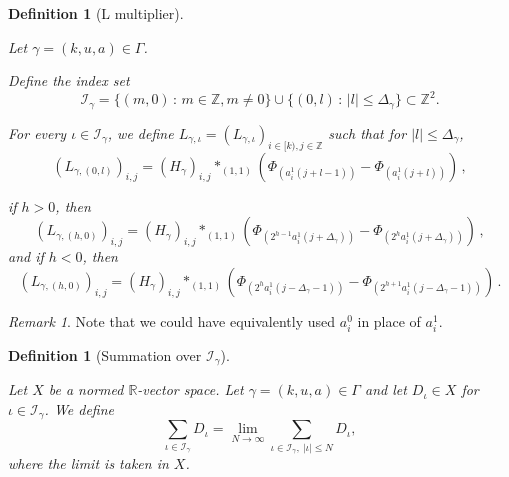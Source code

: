 \documentclass[12pt,reqno]{amsart}
\theoremstyle{plain}
\newtheorem{definition}[theorem]{Definition}
\numberwithin{equation}{section}
\theoremstyle{remark}
\newtheorem{rem}{Remark}[section]
\newcommand{\uses}[1]{}
\newcommand{\usesdefs}[1]{}
\newcommand{\lean}[1]{}
\newcommand{\Z}{{\mathbb Z}}
\newcommand{\R}{{\mathbb R}}
\begin{document}
\begin{definition}[L multiplier]\label{L multiplier}\uses{}\usesdefs{auto:convolution-along-vector-definition,standard bump,geometric parameters,H multiplier}
\lean{Auto.multiplierIndexSet,Auto.lMultiplier}
Let $\gamma=(k,u,a)\in \Gamma$.

Define the index set
\begin{equation}\label{auto:L-kernel-index-set}\mathcal{I}_{\gamma} = \{(m,0)\,:\,m\in\mathbb{Z}, m\not=0\} \cup \{(0,l)\,:\,|l|\le \Delta_{\gamma}\} \subset \mathbb{Z}^2.\end{equation}

For every $\iota \in\mathcal{I}_{\gamma}$, we define  $L_{\gamma,\iota}=(L_{\gamma,\iota})_{i\in [k),j\in \Z}$
such that for $|l|\le \Delta_{\gamma}$,
\begin{equation}\label{auto:L-kernel-central-band}
  (L_{\gamma,(0,l)})_{i,j}= (H_{\gamma})_{i,j} \ast_{(1,1)} (\Phi_{(a_i^1(j+l-1))}-\Phi_{(a_i^1(j+l))})\, ,
 \end{equation}

if $h>0$, then
\begin{equation}\label{auto:L-kernel-positive-band}
(L_{\gamma,(h,0)})_{i,j}= (H_{\gamma})_{i,j} \ast_{(1,1)} (\Phi_{(2^{h-1}a_i^1(j+\Delta_{\gamma}))}-\Phi_{(2^{h}a_i^1(j+\Delta_{\gamma}))})\, ,
\end{equation}
and if $h<0$, then
\begin{equation}\label{auto:L-kernel-negative-band}
 (L_{\gamma,(h,0)})_{i,j}= (H_{\gamma})_{i,j} \ast_{(1,1)} (\Phi_{(2^{h}a_i^1(j-\Delta_{\gamma}-1))}-\Phi_{(2^{h+1}a_i^1(j-\Delta_{\gamma}-1))})\, .
\end{equation}
\end{definition}

\begin{rem}
Note that we could have equivalently used $a_{i}^0$ in place of $a_i^1$.
\end{rem}


\begin{definition}[Summation over $\mathcal I_{\gamma}$]\label{summation-definition}\uses{}\usesdefs{geometric parameters,L multiplier}
\lean{Auto.sumOverMultiplierIndex}
Let $X$ be a normed $\R$-vector space.
Let $\gamma=(k,u,a)\in \Gamma$ and let $D_\iota \in X$ for $\iota \in \mathcal{I}_{\gamma}$. We define
\begin{equation}\label{auto:symmetric-series-definition}
\sum_{\iota \in \mathcal{I}_{\gamma}} D_{\iota}=\lim_{N\to \infty} \sum_{\iota \in\mathcal{I}_{\gamma}, ~|\iota| \leq N} D_{\iota},
\end{equation}
where the limit is taken in $X$.
\end{definition}
\end{document}
